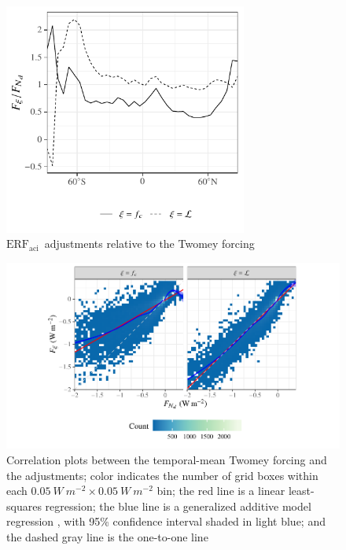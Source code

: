 \documentclass[acp, manuscript]{copernicus}\usepackage[]{graphicx}\usepackage[]{color}
\newcommand\erfaci{\ensuremath{\text{ERF}_\text{aci}}}
\begin{document}
\clearpage

\begin{figure}[t]
  \centering



{\centering \includegraphics[width=8cm]{figure/erf-prp-erf-ratios-1} 

}



  
  \caption{\erfaci\ adjustments relative to the Twomey forcing}
\label{fig:proportionality}
\end{figure}

\clearpage

\begin{figure}[t]
  \centering



{\centering \includegraphics[width=\textwidth]{figure/erf-prp-erf-regress-1} 

}





\caption{Correlation plots between the temporal-mean Twomey forcing and the adjustments; color
  indicates the number of grid boxes within each
  $0.05~\unit{W~m^{-2}} \times 0.05~\unit{W~m^{-2}}$ bin; the red line is a
  linear least-squares regression; the blue line is a generalized additive model
  regression \citep{Wood2011}, with 95\% confidence interval shaded in light
  blue; and the dashed gray line is the one-to-one line}
\label{fig:component-regression}
\end{figure}
\end{document}
